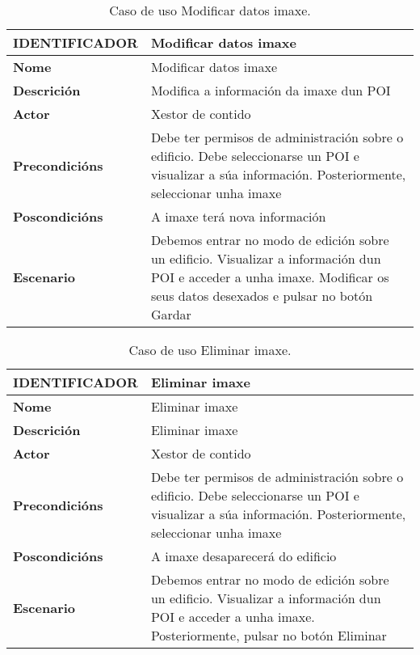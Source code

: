 \begin{table}[tbh]
	\begin{tabular}{|l|p{10cm}|}
		\hline 
		\textbf{IDENTIFICADOR}	& \textbf{Modificar datos imaxe} \\ 
		\hline 
		\textbf{Nome} & Modificar datos imaxe \\ 
		\hline 
		\textbf{Descrición} & Modifica a información da imaxe dun POI \\ 
		\hline 
		\textbf{Actor} & Xestor de contido \\ 
		\hline 
		\textbf{Precondicións} & Debe ter permisos de administración sobre o edificio. Debe seleccionarse un POI e visualizar a súa información. Posteriormente, seleccionar unha imaxe \\ 
		\hline 
		\textbf{Poscondicións} & A imaxe terá nova información \\ 
		\hline 
		\textbf{Escenario} & Debemos entrar no modo de edición sobre un edificio. Visualizar a información dun POI e acceder a unha imaxe. Modificar os seus datos desexados e pulsar no botón Gardar \\ 
		\hline 
	\end{tabular}
	\caption{Caso de uso Modificar datos imaxe.}
	\label{tab:cuModificarImaxe}
\end{table}

\begin{table}[tbh]
	\begin{tabular}{|l|p{10cm}|}
		\hline 
		\textbf{IDENTIFICADOR}	& \textbf{Eliminar imaxe} \\ 
		\hline 
		\textbf{Nome} & Eliminar imaxe \\ 
		\hline 
		\textbf{Descrición} & Eliminar imaxe \\ 
		\hline 
		\textbf{Actor} & Xestor de contido \\ 
		\hline 
		\textbf{Precondicións} & Debe ter permisos de administración sobre o edificio. Debe seleccionarse un POI e visualizar a súa información. Posteriormente, seleccionar unha imaxe \\ 
		\hline 
		\textbf{Poscondicións} & A imaxe desaparecerá do edificio \\ 
		\hline 
		\textbf{Escenario} & Debemos entrar no modo de edición sobre un edificio. Visualizar a información dun POI e acceder a unha imaxe. Posteriormente, pulsar no botón Eliminar \\ 
		\hline 
	\end{tabular}
	\caption{Caso de uso Eliminar imaxe.}
	\label{tab:cuEliminarImaxe}
\end{table}

